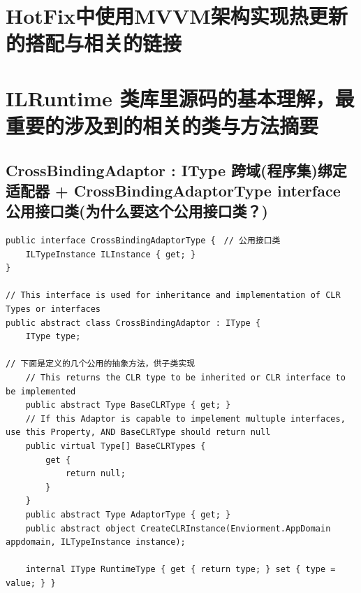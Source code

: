 \documentclass[9pt, b5paper]{article}
\begin{document}
\section{HotFix中使用MVVM架构实现热更新的搭配与相关的链接}
\label{sec-10}

\section{ILRuntime 类库里源码的基本理解，最重要的涉及到的相关的类与方法摘要}
\label{sec-11}
\subsection{CrossBindingAdaptor : IType 跨域(程序集)绑定适配器 + CrossBindingAdaptorType interface 公用接口类(为什么要这个公用接口类？)}
\label{sec-11-1}
\begin{verbatim}
public interface CrossBindingAdaptorType {　// 公用接口类
    ILTypeInstance ILInstance { get; }
}

// This interface is used for inheritance and implementation of CLR Types or interfaces
public abstract class CrossBindingAdaptor : IType {
    IType type;

// 下面是定义的几个公用的抽象方法，供子类实现    
    // This returns the CLR type to be inherited or CLR interface to be implemented
    public abstract Type BaseCLRType { get; }
    // If this Adaptor is capable to impelement multuple interfaces, use this Property, AND BaseCLRType should return null
    public virtual Type[] BaseCLRTypes {
        get {
            return null;
        }
    }
    public abstract Type AdaptorType { get; }
    public abstract object CreateCLRInstance(Enviorment.AppDomain appdomain, ILTypeInstance instance);

    internal IType RuntimeType { get { return type; } set { type = value; } }


\end{verbatim}
\end{document}
